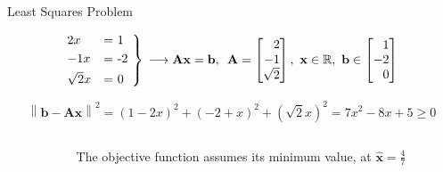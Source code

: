 \documentclass[aspectratio=169]{beamer}
\begin{document}
\begin{frame}[t]{Least Squares Problem}
\vspace{-0.25cm}
\begin{small}
\[ 
    \begin{rcases*}
        2x & = 1 \\
        -1x & = -2 \\
        \sqrt{2}x & = 0
    \end{rcases*} \, \longrightarrow \mathbf{Ax} = \mathbf{b}, \,\,\, \mathbf{A} = \begin{bmatrix*}[r] 2\\-1\\\sqrt{2}\end{bmatrix*}, \,\, \mathbf{x} \in \mathbb{R}, \,\, \mathbf{b} \in \begin{bmatrix*}[r]1\\-2\\0\end{bmatrix*}
\]

\[
    \left\lVert \mathbf{b} - \mathbf{Ax}\right\rVert^2 = \left(1 - 2x\right)^2 + \left(-2 + x\right)^2 + \left(\sqrt{2}x\right)^2 = 7x^2 - 8x + 5 \geq 0
\]
\end{small}

\vspace{-0.25cm}

\begin{columns}
\begin{column}{0.5\textwidth}
\begin{center}
\end{center}
\end{column}

\begin{column}{0.5\textwidth}
The objective function assumes its minimum value, at $\hat{\mathbf{x}} = \frac{4}{7}$ 
\end{column}
\end{columns}
\end{frame}
\end{document}
